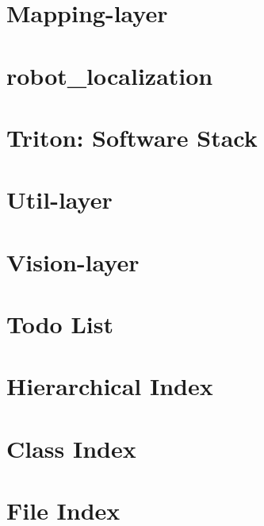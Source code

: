 \let\mypdfximage\pdfximage\def\pdfximage{\immediate\mypdfximage}\documentclass[twoside]{book}
\newcommand{\+}{\discretionary{\mbox{\scriptsize$\hookleftarrow$}}{}{}}
\begin{document}
\chapter{Mapping-\/layer}
\label{md_mapping_README}

\chapter{robot\+\_\+localization}
\label{md_mapping_robot_localization_README}

\chapter{Triton\+: Software Stack}
\label{md_README}

\chapter{Util-\/layer}
\label{md_utils_README}

\chapter{Vision-\/layer}
\label{md_vision_README}

\chapter{Todo List}
\label{todo}

\chapter{Hierarchical Index}

\chapter{Class Index}

\chapter{File Index}

\end{document}

